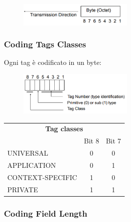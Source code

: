 \begin{figure}[H]
    \centering
    \includegraphics[width=0.5\textwidth]{immagini/BER_direction.png}
\end{figure}

\subsubsection{Coding Tags Classes}

Ogni tag è codificato in un byte:
\begin{figure}[H]
    \centering
    \includegraphics[width=0.5\textwidth]{immagini/BER_tag.png}
\end{figure}

\begin{table}[H]
    \centering
    \begin{tabular}{l c c}
        \multicolumn{3}{c}{\textbf{Tag classes}} \\
                         & Bit 8 & Bit 7         \\
        UNIVERSAL        & 0     & 0             \\
        APPLICATION      & 0     & 1             \\
        CONTEXT-SPECIFIC & 1     & 0             \\
        PRIVATE          & 1     & 1             \\
    \end{tabular}
\end{table}

\subsubsection{Coding Field Length}


